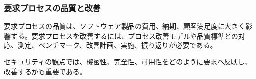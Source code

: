 \subsubsection{要求プロセスの品質と改善}

要求プロセスの品質は、ソフトウェア製品の費用、納期、顧客満足度に大きく影響する。要求プロセスを改善するには、プロセス改善モデルや品質標準との対応、測定、ベンチマーク、改善計画、実施、振り返りが必要である。

セキュリティの観点では、機密性、完全性、可用性をどのように要求へ反映し、改善するかも重要である。
